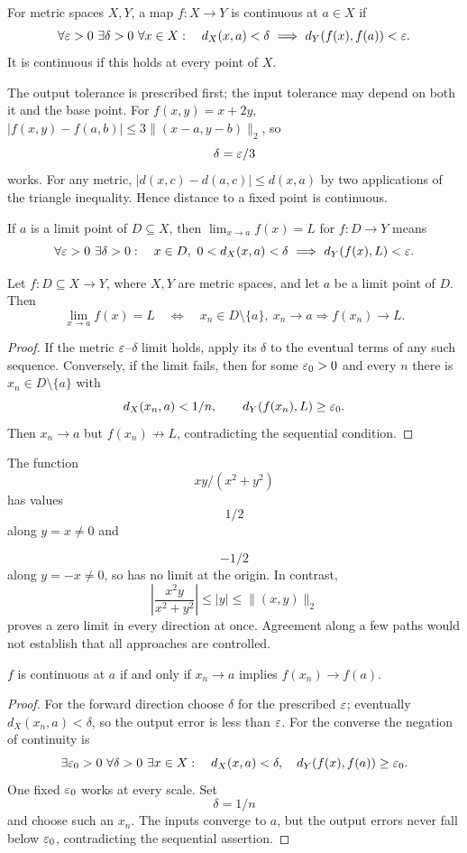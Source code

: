 \begin{definition}
For metric spaces $X,Y$, a map $f:X\to Y$ is continuous at $a\in X$ if
\[
\forall\eps>0\ \exists\delta>0\ \forall x\in X:\quad
d_X(x,a)<\delta\ \Longrightarrow\ d_Y(f(x),f(a))<\eps.
\]
It is continuous if this holds at every point of $X$.
\end{definition}
The output tolerance is prescribed first; the input tolerance may depend on
both it and the base point. For $f(x,y)=x+2y$,
$|f(x,y)-f(a,b)|\leq3\|(x-a,y-b)\|_2$, so
\[
\delta=\varepsilon/3
\]
 works.
For any metric, $|d(x,c)-d(a,c)|\leq d(x,a)$ by two applications of
the triangle inequality. Hence distance to a fixed point is continuous.
\begin{definition}
If $a$ is a limit point of $D\subseteq X$, then $\lim_{x\to a}f(x)=L$
for $f:D\to Y$ means
\[
\forall\eps>0\ \exists\delta>0:\quad
x\in D,\ 0<d_X(x,a)<\delta\ \Longrightarrow\ d_Y(f(x),L)<\eps.
\]
\end{definition}
\begin{theorem}
\label{thm:sequential-map-limit}
Let $f:D\subseteq X\to Y$, where $X,Y$ are metric spaces, and let $a$ be
a limit point of $D$. Then
\[
\lim_{x\to a}f(x)=L
\quad\Longleftrightarrow\quad
x_n\in D\setminus\{a\},\ x_n\to a
\Longrightarrow f(x_n)\to L.
\]
\end{theorem}
\begin{proof}
If the metric $\varepsilon$--$\delta$ limit holds, apply its $\delta$ to the
eventual terms of any such sequence. Conversely, if the limit fails, then
for some $\varepsilon_0>0$ and every $n$ there is
$x_n\in D\setminus\{a\}$ with
\[
d_X(x_n,a)<1/n,
\qquad d_Y(f(x_n),L)\geq\varepsilon_0.
\]
Then $x_n\to a$ but $f(x_n)\not\to L$, contradicting the sequential
condition.
\end{proof}
\begin{example}
The function
\[
xy/(x^2+y^2)
\]
 has values
\[
1/2
\]
 along $y=x\ne0$ and

\[
-1/2
\]
 along $y=-x\ne0$, so has no limit at the origin. In contrast,
\[
\left|\frac{x^2y}{x^2+y^2}\right|\leq|y|\leq\|(x,y)\|_2
\]
proves a zero limit in every direction at once. Agreement along a few paths
would not establish that all approaches are controlled.
\end{example}
\begin{theorem}\label{prop:sequential-continuity}
$f$ is continuous at $a$ if and only if $x_n\to a$ implies $f(x_n)\to f(a)$.
\end{theorem}
\begin{proof}
For the forward direction choose $\delta$ for the prescribed $\varepsilon$;
eventually $d_X(x_n,a)<\delta$, so the output error is less than $\varepsilon$.
For the converse the negation of continuity is
\[
\exists\eps_0>0\ \forall\delta>0\ \exists x\in X:
\quad d_X(x,a)<\delta,\quad d_Y(f(x),f(a))\geq\eps_0.
\]
One fixed $\varepsilon_0$ works at every scale. Set
\[
\delta=1/n
\]
 and choose
such an $x_n$. The inputs converge to $a$, but the output errors never
fall below $\varepsilon_0$, contradicting the sequential assertion.
\end{proof}

